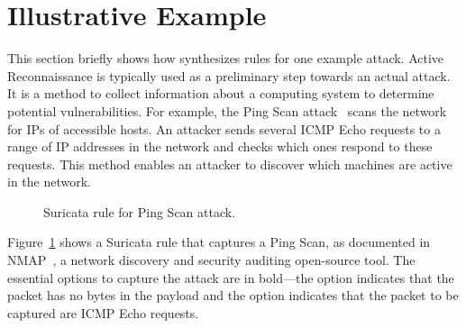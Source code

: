 \documentclass[sigconf,review, anonymous]{acmart}
\begin{document}


\section{Illustrative Example}
\label{sec:suri-metas-coverage}
\label{sec:active-recon}

This section briefly shows how \tname{} synthesizes rules for one
example attack. Active Reconnaissance is typically used as a
preliminary step towards an actual attack. It is a method to collect
information about a computing system to determine potential
vulnerabilities. For example, the Ping Scan attack~\cite{ping-scan}
scans the network for IPs of accessible hosts. An attacker sends
several ICMP Echo requests to a range of IP addresses in the network
and checks which ones respond to these requests. This method enables
an attacker to discover which machines are active in the network.

\begin{figure}[h!]
  
  \vspace{-2ex}  
  \caption{Suricata rule for Ping Scan attack.}
  \label{fig:pingscan-example}
\end{figure}
\vspace{-3ex}

Figure~\ref{fig:pingscan-example} shows a Suricata rule that captures
a Ping Scan, as documented in NMAP~\cite{netmap}, a network discovery
and security auditing open-source tool. The essential options to
capture the attack are in bold---the option 
indicates that the packet has no bytes in the payload and the option
 indicates that the packet to be captured are ICMP
Echo requests.
\end{document}
